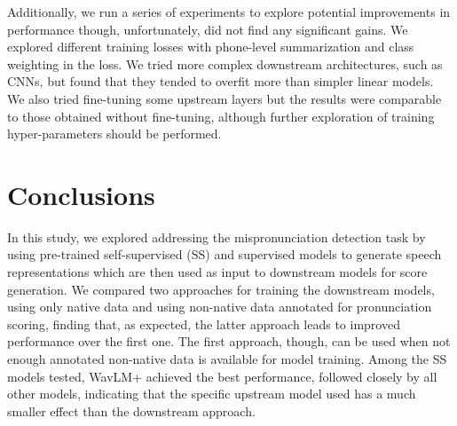 \documentclass{INTERSPEECH2023}
\begin{document}
Additionally, we run a series of experiments to explore potential improvements in performance though, unfortunately, did not find any significant gains. We explored different training losses with phone-level summarization and class weighting in the loss. We tried more complex downstream architectures, such as CNNs, but found that they tended to overfit more than simpler linear models. We also tried fine-tuning some upstream layers but the results were comparable to those obtained without fine-tuning, although further exploration of training hyper-parameters should be performed. 

\section{Conclusions}
In this study, we explored addressing the mispronunciation detection task by using pre-trained self-supervised (SS) and supervised models to generate speech representations which are then used as input to downstream models for score generation. We compared two approaches for training the downstream models, using only native data and using non-native data annotated for pronunciation scoring, finding that, as expected, the latter approach leads to improved performance over the first one. The first approach, though, can be used when not enough annotated non-native data is available for model training. Among the SS models tested, WavLM+ achieved the best performance, followed closely by all other models, indicating that the specific upstream model used has a much smaller effect than the downstream approach. 




\end{document}
